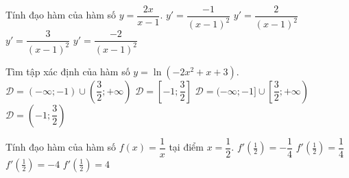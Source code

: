 \begin{ex}%
	Tính đạo hàm của hàm số $y=\dfrac{2x}{x-1}$.
	\choice
	{$y'=\dfrac{-1}{(x-1)^2}$}
	{$y'=\dfrac{2}{(x-1)^2}$}
	{$y'=\dfrac{3}{(x-1)^2}$}
	{\True $y'=\dfrac{-2}{(x-1)^2}$}
\end{ex}

\begin{ex}%
	Tìm tập xác định của hàm số $y=\ln \left(-2x^2+x+3\right)$.
	\choice
	{$\mathscr{D}=(-\infty;-1) \cup\left(\dfrac{3}{2};+\infty\right)$}
	{$\mathscr{D}=\left[-1; \dfrac{3}{2}\right]$}
	{$\mathscr{D}=(-\infty;-1] \cup\left[\dfrac{3}{2};+\infty\right)$}
	{\True $\mathscr{D}=\left(-1; \dfrac{3}{2}\right)$}
\end{ex}

\begin{ex}%
Tính đạo hàm của hàm số $f(x)=\dfrac{1}{x}$ tại điểm $x=\dfrac{1}{2}$.
\choice
{$f'(\frac{1}{2})=-\dfrac{1}{4}$}
{$f'(\frac{1}{2})=\dfrac{1}{4}$}
{\True $f'(\frac{1}{2})=-4$}
{$f'(\frac{1}{2})=4$}
\end{ex}


